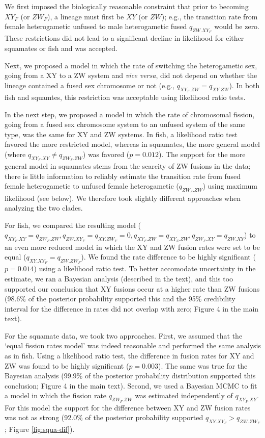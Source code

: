 \documentclass[12pt,twoside]{article}
\begin{document}
We first imposed the biologically reasonable constraint that prior to becoming $XY_F$ (or $ZW_F$), a lineage must first be $XY$ (or $ZW$); e.g., the transition rate from female heterogametic unfused to male heterogametic fused $q_{ZW.XY_F}$ would be zero. These restrictions did not lead to a significant decline in likelihood for either squamates or fish and was accepted.

Next, we proposed a model in which the rate of switching the heterogametic sex, going from a XY to a ZW system and \emph{vice versa}, did not depend on whether the lineage contained a fused sex chromosome or not (e.g., $q_{XY_F.ZW} = q_{XY.ZW}$). In both fish and squamtes, this restriction was acceptable using likelihood ratio tests.

In the next step, we proposed a model in which the rate of chromosomal fission, going from a fused sex chromosome system to an unfused system of the same type, was the same for XY and ZW systems. In fish, a likelihood ratio test favored the more restricted model, whereas in squamates, the more general model (where $q_{XY_F.XY} \neq q_{ZW_F.ZW}$) was favored ($p=\text{0.012}$). The support for the more general model in squamates stems from the scarcity of ZW fusions in the data; there is little information to reliably estimate the transition rate from fused female heterogametic to unfused female heterogametic ($q_{ZW_F.ZW}$) using maximum likelihood (see below). We therefore took slightly different approaches when analyzing the two clades.

For fish, we compared the resulting model ($q_{XY_F.XY} = q_{ZW_F.ZW}, q_{ZW.XY_F}=q_{XY.ZW_F}=\text{0}, q_{XY_F.ZW}=q_{XY_Z.ZW}, q_{ZW_F.XY}=q_{ZW.XY}$) to an even more reduced model in which the XY and ZW fusion rates were set to be equal ($q_{XY.XY_F}=q_{ZW.ZW_F}$). We found the rate difference to be highly significant ($p=\text{0.014}$) using a likelihood ratio test. To better accomodate uncertainty in the estimate, we ran a Bayesian analysis (described in the text), and this too supported our conclusion that XY fusions occur at a higher rate than ZW fusions (98.6\% of the posterior probability supported this and the 95\% credibility interval for the difference in rates did not overlap with zero; Figure 4 in the main text).

For the squamate data, we took two approaches. First, we assumed that the `equal fission rates model' was indeed reasonable and performed the same analysis as in fish. Using a likelihood ratio test, the difference in fusion rates for XY and ZW was found to be highly significant ($p=\text{0.003}$). The same was true for the Bayesian analysis (99.9\% of the posterior probability distribution supported this conclusion; Figure 4 in the main text). Second, we used a Bayesian MCMC to fit a model in which the fission rate $q_{ZW_F.ZW}$ was estimated independently of $q_{XY_F.XY}$. For this model the support for the difference between XY and ZW fusion rates was not as strong (92.0\% of the posterior probability supported $q_{XY.XY_F} > q_{ZW.ZW_F}$; Figure \ref{fig:squa-dif}).
\end{document}
